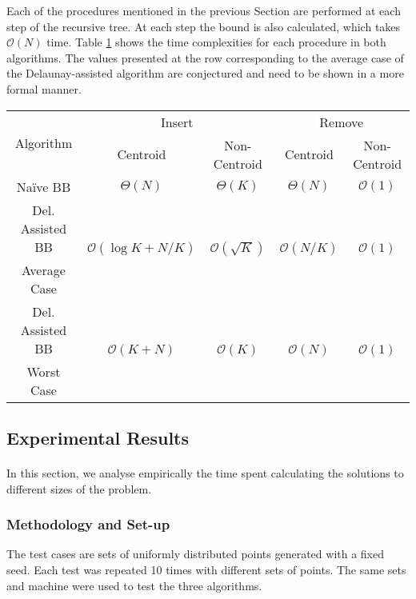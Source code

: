 Each of the procedures mentioned in the previous Section are performed at each step of the recursive tree. At each step the bound is also calculated, which takes $\mathcal{O}(N)$ time. Table \ref{tab:exptime} shows the time complexities for each procedure in both algorithms. The values presented at the row corresponding to the average case of the Delaunay-assisted algorithm are conjectured and need to be shown in a more formal manner.
\begin{table}[H]
\begin{center}
\begin{tabular}{|c|c|c|c|c|}
	\hline
	\multirow{2}{*}{Algorithm}	& \multicolumn{2}{c|}{Insert}	& \multicolumn{2}{c|}{Remove}	\\ \cline{2-5}
								& Centroid		& Non-Centroid	& Centroid		& Non-Centroid	\\ \hline
				Naïve BB		& $\Theta(N)$ & $\Theta(K)$ 	& $\Theta(N)$ & $\mathcal{O}(1)$ \\ \hline\hline
				Del. Assisted BB	
				& \multirow{2}{*}{$\mathcal{O}(\log{K}+N/K)$}
				& \multirow{2}{*}{$\mathcal{O}(\sqrt{K})$}
				& \multirow{2}{*}{$\mathcal{O}(N/K)$ }
				& \multirow{2}{*}{$\mathcal{O}(1)$}\\
				Average Case & & & & \\ \hline
		Del. Assisted BB 
				& \multirow{2}{*}{$\mathcal{O}(K+N)$}
				& \multirow{2}{*}{$\mathcal{O}(K)$}	
				& \multirow{2}{*}{$\mathcal{O}(N)$} 
				& \multirow{2}{*}{$\mathcal{O}(1)$}\\ 
				Worst Case 	& & & & \\ \hline
\end{tabular}
	\label{tab:exptime}
\end{center}
\end{table}
\subsection{Experimental Results}
\paragraph{}
In this section, we analyse empirically the time spent calculating the solutions to different sizes of the problem. 
\subsubsection*{Methodology and Set-up}
The test cases are sets of uniformly distributed points generated with a fixed seed. Each test was repeated 10 times with different sets of points. The same sets and machine were used to test the three algorithms.

